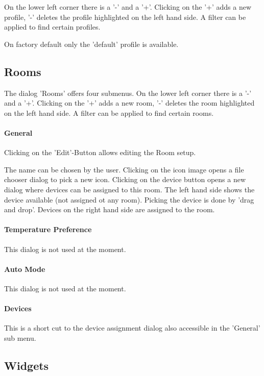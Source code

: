 On the lower left corner there is a '-' and a '+'. Clicking on the '+' adds a new
profile, '-' deletes the profile highlighted on the left hand side. A filter can 
be applied to find certain profiles.

On factory default only the 'default' profile is available.

\subsection{Rooms}

The dialog 'Rooms' offers four submenus. On the lower left corner there is a '-' and 
a '+'. Clicking on the '+' adds a new room, '-' deletes the room highlighted on the left 
hand side. A filter can be applied to find certain rooms.

\paragraph{General}

Clicking on the 'Edit'-Button allows editing the Room setup.

The name can be chosen by the user. Clicking on the icon image opens a file chooser 
dialog to pick a new icon. Clicking on the device button opens a new dialog where 
devices can be assigned to this room. The left hand side shows the device available (not 
assigned ot any room). Picking the device is done by 'drag and drop'.
Devices on the right hand side are assigned to the room.

\paragraph{Temperature Preference}

This dialog is not used at the moment.

\paragraph{Auto Mode}

This dialog is not used at the moment.

\paragraph{Devices}

This is a short cut to the device assignment dialog also accessible in the 'General'
sub menu.

\subsection{Widgets}

